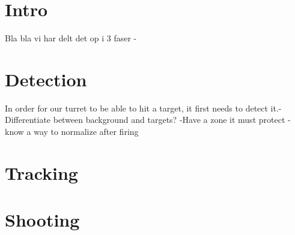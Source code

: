 \section{Intro}
Bla bla vi har delt det op i 3 faser - 
\section{Detection}
In order for our turret to be able to hit a target, it first needs to detect it.-Differentiate between background and targets?
-Have a zone it must protect
-know a way to normalize after firing 
\section{Tracking}
\section{Shooting}
